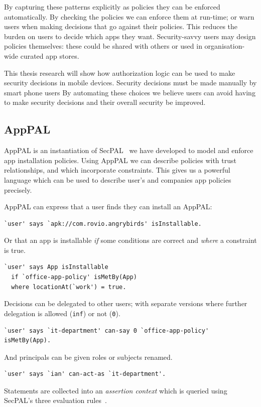 \documentclass[a4paper]{scrartcl}
\begin{document}
By capturing these patterns explicitly as policies they can be enforced automatically.
By checking the policies we can enforce them at run-time; or warn users when making decisions that go against their policies.
This reduces the burden on users to decide which apps they want.
Security-savvy users may design policies themselves: these could be shared with others or used in organisation-wide curated app stores.


This thesis research will show how authorization logic can be used to make security decisions in mobile devices.
Security decisions must be made manually by smart phone users
By automating these choices we believe users can avoid having to make security decisions and their overall security be improved.

\subsection{AppPAL}

AppPAL is an instantiation of SecPAL~\citep{Becker:2006vh} we have developed to model and enforce app installation policies.
Using AppPAL we can describe policies with trust relationships, and which incorporate constraints.
This gives us a powerful language which can be used to describe user's and companies app policies precisely.

AppPAL can express that a user finds they can install an AppPAL:
\begin{lstlisting}
`user' says `apk://com.rovio.angrybirds' isInstallable.
\end{lstlisting}
Or that an app is installable \emph{if} some conditions are correct and \emph{where} a constraint is true.
\begin{lstlisting}
`user' says App isInstallable
  if `office-app-policy' isMetBy(App)
  where locationAt(`work') = true.
\end{lstlisting}
Decisions can be delegated to other users; with separate versions where further delegation is allowed (\lstinline{inf}) or not (\lstinline{0}).
\begin{lstlisting}
`user' says `it-department' can-say 0 `office-app-policy' isMetBy(App).
\end{lstlisting}
And principals can be given roles or subjects renamed.
\begin{lstlisting}
`user' says `ian' can-act-as `it-department'.
\end{lstlisting}
Statements are collected into an \emph{assertion context} which is queried using SecPAL's three evaluation rules~\citep{Becker:2006vh}.
\end{document}
